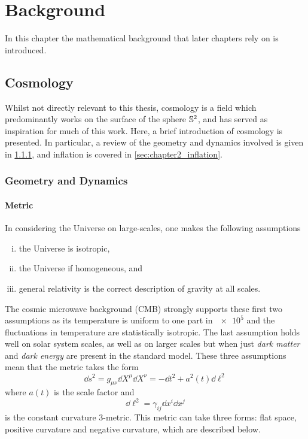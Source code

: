 \chapter{Background}\label{sec:chapter2}

In this chapter the mathematical background that later chapters rely on is introduced.

\section{Cosmology}

Whilst not directly relevant to this thesis, cosmology is a field which predominantly works on the surface of the sphere \(\mathbb{S}^{2}{}\), and has served as inspiration for much of this work.
Here, a brief introduction of cosmology is presented.
In particular, a review of the geometry and dynamics involved is given in \cref{sec:chapter2_geometry_dynamics}, and inflation is covered in \cref{sec:chapter2_inflation}.

\subsection{Geometry and Dynamics}\label{sec:chapter2_geometry_dynamics}

\subsubsection{Metric}

In considering the Universe on large-scales, one makes the following assumptions
%
\begin{enumerate}[(i),nosep,left=\parindent]
	\item the Universe is isotropic,
	\item the Universe if homogeneous, and
	\item general relativity is the correct description of gravity at all scales.
\end{enumerate}
%
The cosmic microwave background (CMB) strongly supports these first two assumptions as its temperature is uniform to one part in \(\num{e5}\) and the fluctuations in temperature are statistically isotropic.
The last assumption holds well on solar system scales, as well as on larger scales but when just \emph{dark matter} and \emph{dark energy} are present in the standard model.
These three assumptions mean that the metric takes the form
%
\begin{equation}\label{eq:chapter2_original_metric}
	\dd{s^{2}}
	= g_{\mu\nu} \dd{X^{\mu}} \dd{X^{\nu}}
	= -\dd{t^{2}} + a^{2}(t) \dd{\ell^{2}}
\end{equation}
%
where \(a(t)\) is the scale factor and
%
\begin{equation}
	\dd{\ell^{2}}
	= \gamma_{i j} \dd{x^{i}} \dd{x^{j}}
\end{equation}
%
is the constant curvature 3-metric.
This metric can take three forms: flat space, positive curvature and negative curvature, which are described below.

